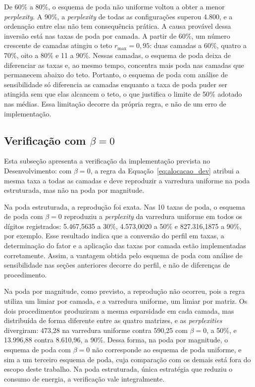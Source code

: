 De 60\% a 80\%, o esquema de poda não uniforme voltou a obter a menor \textit{perplexity}. A
90\%, a \textit{perplexity} de todas as configurações superou 4.800, e a ordenação entre elas
não tem consequência prática. A causa provável dessa inversão está nas taxas de poda por
camada. A partir de 60\%, um número crescente de camadas atingiu o teto $r_{\max} = 0{,}95$:
duas camadas a 60\%, quatro a 70\%, oito a 80\% e 11 a 90\%. Nessas camadas, o esquema de poda
deixa de diferenciar as taxas e, ao mesmo tempo, concentra mais poda nas camadas que permanecem
abaixo do teto. Portanto, o esquema de poda com análise de sensibilidade só diferencia as
camadas enquanto a taxa de poda puder ser atingida sem que elas alcancem o teto, o que
justifica o limite de 50\% adotado nas médias. Essa limitação
decorre da própria regra, e não de um erro de implementação.

\subsection{Verificação com $\beta = 0$}\label{subsec:controle_beta_zero}

Esta subseção apresenta a verificação da implementação prevista no Desenvolvimento:
com $\beta = 0$, a regra da Equação~\ref{eq:alocacao_dev} atribui a mesma taxa a todas as
camadas e deve reproduzir a varredura uniforme na poda estruturada, mas não na poda por
magnitude.

Na poda estruturada, a reprodução foi exata. Nas 10 taxas de poda, o esquema de poda com $\beta
= 0$ reproduziu a \textit{perplexity} da varredura uniforme em todos os dígitos registrados:
5.467,5635 a 30\%, 4.573,0020 a 50\% e 827.316,1875 a 90\%, por exemplo. Esse resultado indica
que a conversão do perfil em taxas, a determinação do fator e a aplicação das taxas por camada
estão implementadas corretamente. Assim, a vantagem obtida pelo esquema de poda com análise de
sensibilidade nas seções anteriores decorre do perfil, e não de diferenças de procedimento.

Na poda por magnitude, como previsto, a reprodução não ocorreu, pois a regra utiliza um limiar
por camada, e a varredura uniforme, um limiar por matriz. Os dois
procedimentos produziram a mesma esparsidade em cada camada, mas distribuída de forma diferente
entre as quatro matrizes, e as \textit{perplexities} divergiram: 473,28 na varredura uniforme
contra 590,25 com $\beta = 0$, a 50\%, e 13.996,88 contra 8.610,96, a 90\%. Dessa forma, na
poda por magnitude, o esquema de poda com $\beta = 0$ não corresponde ao esquema de poda
uniforme, e sim a um terceiro esquema de poda, cuja comparação
com os demais está fora do escopo deste trabalho. Na poda estruturada, única estratégia que
reduziu o consumo de energia, a verificação vale integralmente.

